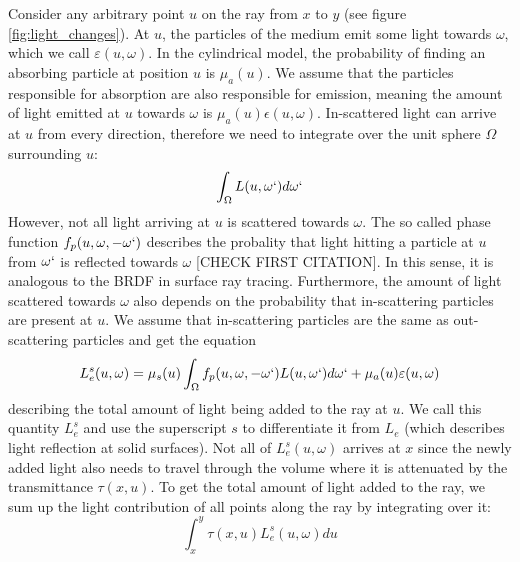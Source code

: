 Consider any arbitrary point ${u}$ on the ray from ${x}$ to ${y}$ (see figure \ref{fig:light_changes}).
At ${u}$, the particles of the medium emit some light towards $\omega$\cite{468400}, which we call $\varepsilon ({u}, \omega )$. In the cylindrical model, the probability of finding an absorbing particle at position ${u}$ is ${\mu}_a({u})$. We assume that the particles responsible for absorption are also responsible for emission\cite{468400}, meaning the amount of light emitted at ${u}$ towards $\omega$ is ${\mu}_a({u})\epsilon ({u}, \omega )$.
In-scattered light can arrive at ${u}$ from every direction, therefore we need to integrate over the unit sphere $\Omega$ surrounding ${u}$\cite{10.1145/280814.280925}:
\begin{equation}
\int_{\Omega} L({u}, \omega `)d\omega `
\end{equation}
However, not all light arriving at ${u}$ is scattered towards $\omega $. The so called phase function $f_p({u}, \omega , -\omega `)$ describes the probality that light hitting a particle at ${u}$ from $\omega `$ is reflected towards $\omega$ \cite{10.1145/280814.280925, Cerezo2005} [CHECK FIRST CITATION]. In this sense, it is analogous to the BRDF \cite{10.1145/965141.563893} in surface ray tracing. Furthermore, the amount of light scattered towards $\omega $ also depends on the probability that in-scattering particles are present at ${u}$\cite{10.1145/280814.280925}. We assume that in-scattering particles are the same as out-scattering particles and get the equation
\begin{equation}
L_e^s({u}, \omega ) = {\mu}_s({u})\int_{\Omega} f_p({u}, \omega , -\omega `)L({u}, \omega `)d\omega `  + {\mu}_a({u})\varepsilon ({u}, \omega )
\end{equation}
describing the total amount of light being added to the ray at ${u}$. We call this quantity $L_e^s$ and use the superscript $s$ to differentiate it from $L_e$ (which describes light reflection at solid surfaces).
Not all of $L_e^s({u}, \omega )$ arrives at ${x}$ since the newly added light also needs to travel through the volume where it is attenuated by the transmittance $\tau ({x}, {u})$.
To get the total amount of light added to the ray, we sum up the light contribution of all points along the ray by integrating over it\cite{zhou2007real-time}:
\begin{equation}
\int_{{x}}^{{y}} \tau({x}, {u})L_e^s({u}, \omega )d{u}
\end{equation}
